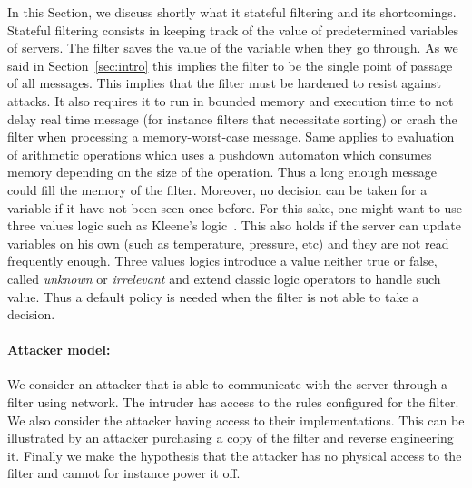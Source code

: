 In this Section, we discuss shortly what it stateful filtering and its
shortcomings.
Stateful filtering consists in keeping track of the value of predetermined
variables of servers.
The filter saves the value of the variable when they go through.
As we said in Section~\ref{sec:intro} this implies the filter to be the single
point of passage of all messages.
This implies that the filter must be hardened to resist against attacks.
It also requires it to run in bounded memory and execution time to not delay
real time message (for instance filters that necessitate sorting) or crash the
filter when processing a memory-worst-case message.
Same applies to evaluation of arithmetic operations which uses a pushdown
automaton which consumes memory depending on the size of the operation.
Thus a long enough message could fill the memory of the filter.
%
Moreover, no decision can be taken for a variable if it have not been seen once
before.
For this sake, one might want to use three values logic such as Kleene's
logic~\cite{Kle52}.
This also holds if the server can update variables on his own (such as
temperature, pressure, etc) and they are not read frequently enough.
Three values logics introduce a value neither true or false, called
{\em unknown} or {\em irrelevant} and extend classic logic operators to handle
such value.
Thus a default policy is needed when the filter is not able to take a decision.

\paragraph{Attacker model:} We consider an attacker that is able to communicate
with the server through a filter using network.
The intruder has access to the rules configured for the filter.
We also consider the attacker having access to their implementations.
This can be illustrated by an attacker purchasing a copy of the filter and
reverse engineering it.
Finally we make the hypothesis that the attacker has no physical access to the
filter and cannot for instance power it off.
